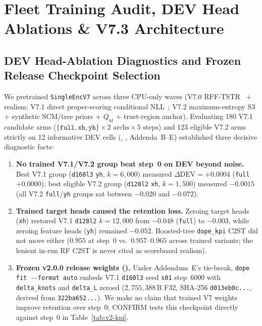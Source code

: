 \documentclass[10pt,letterpaper]{article}
\begin{document}
\section{Fleet Training Audit, DEV Head Ablations \& V7.3 Architecture}
\subsection{DEV Head-Ablation Diagnostics and Frozen Release Checkpoint Selection}
We pretrained \texttt{SingleEncV7} across three CPU-only waves (V7.0 RFF-TSTR~\citep{rahimi2007random} + realism; V7.1 direct proper-scoring conditional NLL~\citep{gneiting2007strictly}; V7.2 maximum-entropy S3 + synthetic SCM/tree priors + $Q_{\mathrm{nl}}$ + trust-region anchor).
Evaluating 180 V7.1 candidate arms ($\{\texttt{full}, \texttt{xh}, \texttt{yh}\}\times 2\text{ archs}\times 5\text{ steps}$) and 123 eligible V7.2 arms strictly on 12 informative DEV cells (, , Addenda~B--E) established three decisive diagnostic facts:
\begin{enumerate}[leftmargin=1.4em,itemsep=2pt]
  \item \textbf{No trained V7.1/V7.2 group beat step~0 on DEV beyond noise.} Best V7.1 group (\texttt{d160l3} \texttt{yh}, $k=6{,}000$) measured $\Delta\text{DEV}=+0.0004$ (\texttt{full} $+0.0000$); best eligible V7.2 group (\texttt{d128l2} \texttt{xh}, $k=1{,}500$) measured $-0.0015$ (all V7.2 \texttt{full}/\texttt{yh} groups sat between $-0.020$ and $-0.072$).
  \item \textbf{Trained target heads caused the retention loss.} Zeroing target heads (\texttt{xh}) restored V7.1 \texttt{d128l2} $k=12{,}000$ from $-0.048$ (\texttt{full}) to $-0.003$, while zeroing feature heads (\texttt{yh}) remained $-0.052$. Boosted-tree \texttt{dope\_kpi} C2ST did not move either ($0.955$ at step~0 vs.\ $0.957\text{--}0.965$ across trained variants; the lenient in-run RF C2ST is never cited as scoreboard realism).
  \item \textbf{Frozen v2.0.0 release weights ().} Under Addendum~E's tie-break, \texttt{dope fit -{}-format auto} embeds V7.1 \texttt{d160l3} seed \texttt{s01} step~6000 with \texttt{delta\_knots} and \texttt{delta\_L} zeroed ($2{,}755{,}388\,\text{B}$ F32, SHA-256 \texttt{d013eb0c...}, derived from \texttt{322ba652...}). We make no claim that trained V7 weights improve retention over step~0; CONFIRM tests this checkpoint directly against step~0 in Table~\ref{tab:v2-kpi}.
\end{enumerate}
\end{document}
